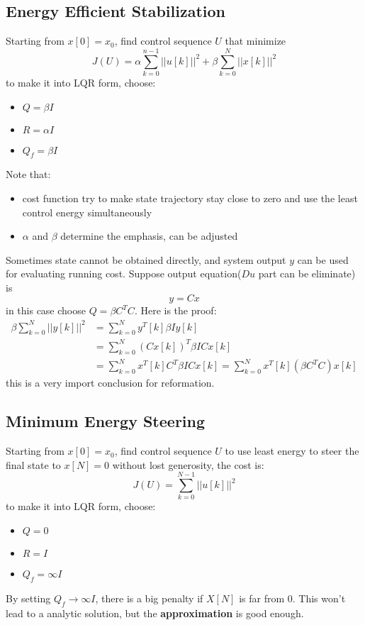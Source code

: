 \documentclass[10pt,a4paper,oneside]{article}
\begin{document}
\subsection{Energy Efficient Stabilization}
Starting from $x[0] = x_0$, find control sequence $U$ that minimize
\[
J(U) = \alpha \sum_{k=0}^{n-1} || u[k] ||^2 + \beta \sum_{k=0}^{N} || x[k] ||^2
\]
to make it into LQR form, choose:
\begin{itemize}
	\item $Q = \beta I$
	\item $R = \alpha I$
	\item $Q_f = \beta I$
\end{itemize}
Note that:
\begin{itemize}
	\item cost function try to make state trajectory stay close to zero and use the least control energy simultaneously
	\item $\alpha$ and $\beta$ determine the emphasis, can be adjusted
\end{itemize}
Sometimes state cannot be obtained directly, and system output $y$ can be used for evaluating running cost. Suppose output equation($Du$ part can be eliminate) is
\[
y = Cx
\]
in this case choose $Q = \beta C^T C$. Here is the proof:
\begin{align*}
\beta \sum_{k=0}^{N} || y[k] ||^2 &=  \sum_{k=0}^{N} y^T [k] \beta I y[k]\\
&= \sum_{k=0}^{N} (Cx[k])^T \beta I Cx[k]\\
&= \sum_{k=0}^{N} x^T[k] C^T \beta I Cx[k] = \sum_{k=0}^{N} x^T[k] (\beta C^T C)x[k]
\end{align*}
this is a very import conclusion for reformation.

\subsection{Minimum Energy Steering}
Starting from $x[0] = x_0$, find control sequence $U$ to use least energy to steer the final state to $x[N] = 0$ without lost generosity, the cost is:
\[
J(U) = \sum_{k=0}^{N-1} ||u[k]||^2
\]
to make it into LQR form, choose:
\begin{itemize}
	\item $Q = 0$
	\item $R =  I$
	\item $Q_f = \infty I$
\end{itemize}
By setting $Q_f \rightarrow \infty I$, there is a big penalty if $X[N]$ is far from $0$. This won't lead to a analytic solution, but the \textbf{approximation} is good enough. 
\end{document}
